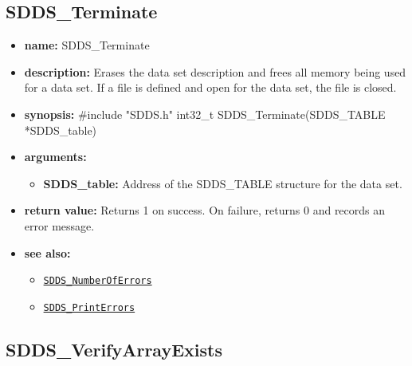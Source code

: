 \documentclass[11pt]{article}
\newcommand{\progref}[1]{\hyperref[SDDS_#1]{\tt SDDS\_#1}}
\begin{document}
\subsection{SDDS\_Terminate}
\label{SDDS_Terminate}

\begin{itemize}
\item {\bf name:}\newline
SDDS\_Terminate
\item {\bf description:}\newline
Erases the data set description and frees all memory being used for a data set. If a file is defined and open for the data set, the file is closed.
\item {\bf synopsis:} \#include "SDDS.h"\newline
int32\_t SDDS\_Terminate(SDDS\_TABLE *SDDS\_table)
\item {\bf arguments:}
\begin{itemize}
\item {\bf SDDS\_table:} Address of the SDDS\_TABLE structure for the data set.
\end{itemize}
\item {\bf return value:}\newline
Returns 1 on success. On failure, returns 0 and records an error message.
\item {\bf see also:}
\begin{itemize}
\item \progref{NumberOfErrors}
\item \progref{PrintErrors}
\end{itemize}
\end{itemize}

\subsection{SDDS\_VerifyArrayExists}
\label{SDDS_VerifyArrayExists}
\end{document}
